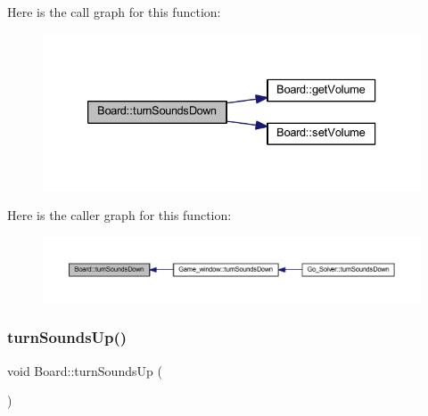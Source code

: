 Here is the call graph for this function\+:
\nopagebreak
\begin{figure}[H]
\begin{center}
\leavevmode
\includegraphics[width=333pt]{class_board_a648552cb139f9c0cc61f6372251739b2_cgraph}
\end{center}
\end{figure}
Here is the caller graph for this function\+:
\nopagebreak
\begin{figure}[H]
\begin{center}
\leavevmode
\includegraphics[width=350pt]{class_board_a648552cb139f9c0cc61f6372251739b2_icgraph}
\end{center}
\end{figure}
\mbox{\label{class_board_a77d145afa8d71a85c4097aca08c30525}} 
\subsubsection{\texorpdfstring{turn\+Sounds\+Up()}{turnSoundsUp()}}
{\footnotesize\ttfamily void Board\+::turn\+Sounds\+Up (\begin{DoxyParamCaption}{ }\end{DoxyParamCaption})}

